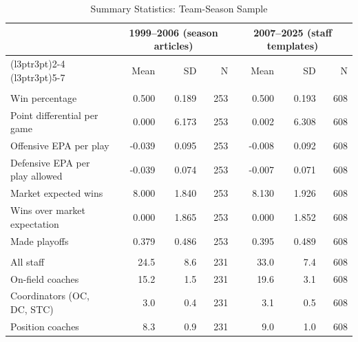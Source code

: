 \begin{table}[!h]
\centering
\caption{Summary Statistics: Team-Season Sample \label{tab:sumstats-team-season}}
\centering
\fontsize{9}{11}\selectfont
\begin{threeparttable}
\begin{tabular}[t]{lrrrrrr}
\toprule
\multicolumn{1}{c}{ } & \multicolumn{3}{c}{1999--2006 (season articles)} & \multicolumn{3}{c}{2007--2025 (staff templates)} \\
\cmidrule(l{3pt}r{3pt}){2-4} \cmidrule(l{3pt}r{3pt}){5-7}
 & Mean & SD & N & Mean & SD & N\\
\midrule
\addlinespace[0.3em]
\multicolumn{7}{l}{\textbf{Outcomes (regular season)}}\\
\hspace{1em}Win percentage & 0.500 & 0.189 & 253 & 0.500 & 0.193 & 608\\
\hspace{1em}Point differential per game & 0.000 & 6.173 & 253 & 0.002 & 6.308 & 608\\
\hspace{1em}Offensive EPA per play & -0.039 & 0.095 & 253 & -0.008 & 0.092 & 608\\
\hspace{1em}Defensive EPA per play allowed & -0.039 & 0.074 & 253 & -0.007 & 0.071 & 608\\
\hspace{1em}Market expected wins & 8.000 & 1.840 & 253 & 8.130 & 1.926 & 608\\
\hspace{1em}Wins over market expectation & 0.000 & 1.865 & 253 & 0.000 & 1.852 & 608\\
\hspace{1em}Made playoffs & 0.379 & 0.486 & 253 & 0.395 & 0.489 & 608\\
\addlinespace[0.3em]
\multicolumn{7}{l}{\textbf{Staff size (persons listed)}}\\
\hspace{1em}All staff & 24.5 & 8.6 & 231 & 33.0 & 7.4 & 608\\
\hspace{1em}On-field coaches & 15.2 & 1.5 & 231 & 19.6 & 3.1 & 608\\
\hspace{1em}Coordinators (OC, DC, STC) & 3.0 & 0.4 & 231 & 3.1 & 0.5 & 608\\
\hspace{1em}Position coaches & 8.3 & 0.9 & 231 & 9.0 & 1.0 & 608\\

\end{tabular}
\end{threeparttable}
\end{table}
